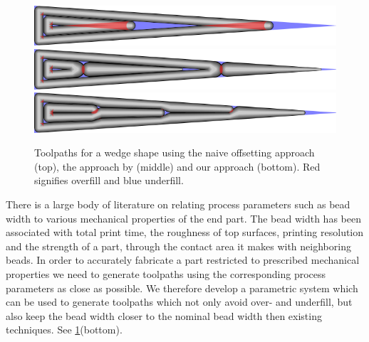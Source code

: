 \begin{figure}\centering
\includegraphics[width=\columnwidth]{sources/intro/TEST_naive_pretty.png}
\includegraphics[width=\columnwidth]{sources/intro/TEST_Center_pretty.png}
\includegraphics[width=\columnwidth]{sources/intro/TEST_Distributed_pretty.png}
\caption{
Toolpaths for a wedge shape using the naive offsetting approach (top), the approach by \citeauthor{Jin2017}(middle) and our approach (bottom).
Red signifies overfill and blue underfill.
}
\label{intro_wedge}
\end{figure}



There is a large body of literature on relating process parameters such as bead width to various mechanical properties of the end part.
The bead width has been associated with total print time, the roughness of top surfaces, printing resolution and the strength of a part, through the contact area it makes with neighboring beads. \cite{N.Turner2014,ahn2002anisotropic}
In order to accurately fabricate a part restricted to prescribed mechanical properties we need to generate toolpaths using the corresponding process parameters as close as possible.
We therefore develop a parametric system which can be used to generate toolpaths which not only avoid over- and underfill, but also keep the bead width closer to the nominal bead width then existing techniques.
See \cref{intro_wedge}(bottom).

